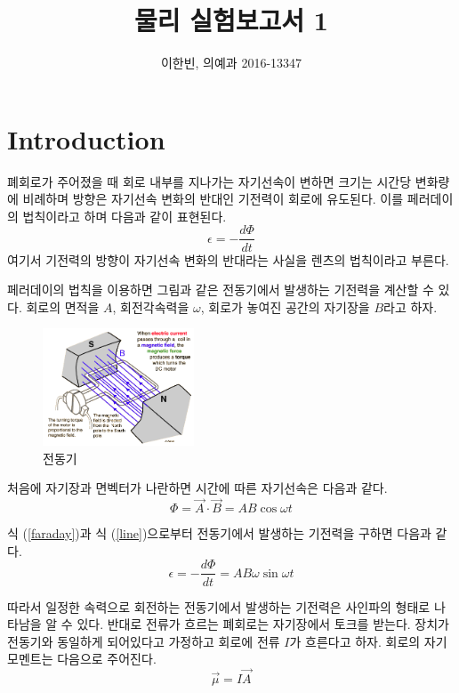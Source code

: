 \documentclass[a4paper]{article}
\title{물리 실험보고서 1}
\author{이한빈, 의예과 2016-13347}
\begin{document}
\maketitle

\section{Introduction}
	폐회로가 주어졌을 때 회로 내부를 지나가는 자기선속이 변하면 크기는 시간당 변화량에 비례하며 방향은 자기선속 변화의 반대인 기전력이 회로에 유도된다.
	이를 페러데이의 법칙이라고 하며 다음과 같이 표현된다.
	\begin{equation} \label{faraday}
		\epsilon = -\frac{d\Phi}{dt} 
	\end{equation}
	여기서 기전력의 방향이 자기선속 변화의 반대라는 사실을 렌츠의 법칙이라고 부른다.

	페러데이의 법칙을 이용하면 그림과 같은 전동기에서 발생하는 기전력을 계산할 수 있다.
	회로의 면적을 $A$, 회전각속력을 $\omega$, 회로가 놓여진 공간의 자기장을 $B$라고 하자.
	\begin{figure}[h] 
		\centering 
		\includegraphics[width=0.4\textwidth]{img/motor.png}
		\caption{전동기}
		\label{fig:motor}
	\end{figure}
	처음에 자기장과 면벡터가 나란하면 시간에 따른 자기선속은 다음과 같다.
	\begin{equation} \label{line}
		\Phi = \vec{A} \cdot \vec{B} = AB\cos{}\omega{}t
	\end{equation} 

	식 (\ref{faraday})과 식 (\ref{line})으로부터 전동기에서 발생하는 기전력을 구하면 다음과 같다.
	\begin{equation}
		\epsilon = -\frac{d\Phi}{dt} = AB\omega{}\sin{}\omega{}t
		\label{eq:period}
	\end{equation}

	따라서 일정한 속력으로 회전하는 전동기에서 발생하는 기전력은 사인파의 형태로 나타남을 알 수 있다.
	반대로 전류가 흐르는 폐회로는 자기장에서 토크를 받는다.
	장치가 전동기와 동일하게 되어있다고 가정하고 회로에 전류 $I$가 흐른다고 하자.
	회로의 자기모멘트는 다음으로 주어진다.
	\begin{equation}
		\vec{\mu} = I\vec{A}
	\end{equation}
\end{document}
